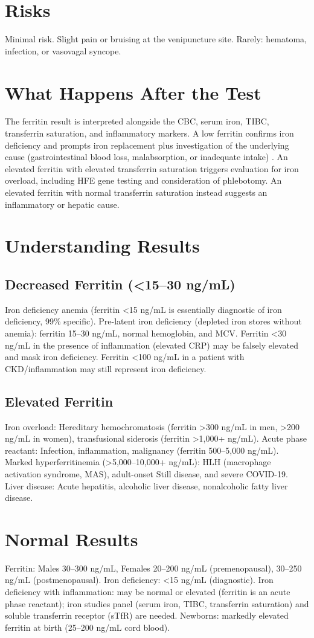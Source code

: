 \section*{Risks}
Minimal risk. Slight pain or bruising at the venipuncture site. Rarely: hematoma, infection, or vasovagal syncope.
\section*{What Happens After the Test}
The ferritin result is interpreted alongside the CBC, serum iron, TIBC, transferrin saturation, and inflammatory markers. A low ferritin confirms iron deficiency and prompts iron replacement plus investigation of the underlying cause (gastrointestinal blood loss, malabsorption, or inadequate intake) \cite{guyatt1992laboratory}. An elevated ferritin with elevated transferrin saturation triggers evaluation for iron overload, including HFE gene testing and consideration of phlebotomy. An elevated ferritin with normal transferrin saturation instead suggests an inflammatory or hepatic cause.
\section*{Understanding Results}
\subsection*{Decreased Ferritin (<15--30 ng/mL)}
Iron deficiency anemia (ferritin <15 ng/mL is essentially diagnostic of iron deficiency, 99\% specific). Pre-latent iron deficiency (depleted iron stores without anemia): ferritin 15--30 ng/mL, normal hemoglobin, and MCV. Ferritin <30 ng/mL in the presence of inflammation (elevated CRP) may be falsely elevated and mask iron deficiency. Ferritin <100 ng/mL in a patient with CKD/inflammation may still represent iron deficiency.
\subsection*{Elevated Ferritin}
Iron overload: Hereditary hemochromatosis (ferritin >300 ng/mL in men, >200 ng/mL in women), transfusional siderosis (ferritin >1,000+ ng/mL). Acute phase reactant: Infection, inflammation, malignancy (ferritin 500--5,000 ng/mL). Marked hyperferritinemia (>5,000--10,000+ ng/mL): HLH (macrophage activation syndrome, MAS), adult-onset Still disease, and severe COVID-19. Liver disease: Acute hepatitis, alcoholic liver disease, nonalcoholic fatty liver disease.
\section*{Normal Results}
Ferritin: Males 30--300 ng/mL, Females 20--200 ng/mL (premenopausal), 30--250 ng/mL (postmenopausal). Iron deficiency: <15 ng/mL (diagnostic). Iron deficiency with inflammation: may be normal or elevated (ferritin is an acute phase reactant); iron studies panel (serum iron, TIBC, transferrin saturation) and soluble transferrin receptor (sTfR) are needed. Newborns: markedly elevated ferritin at birth (25--200 ng/mL cord blood).
